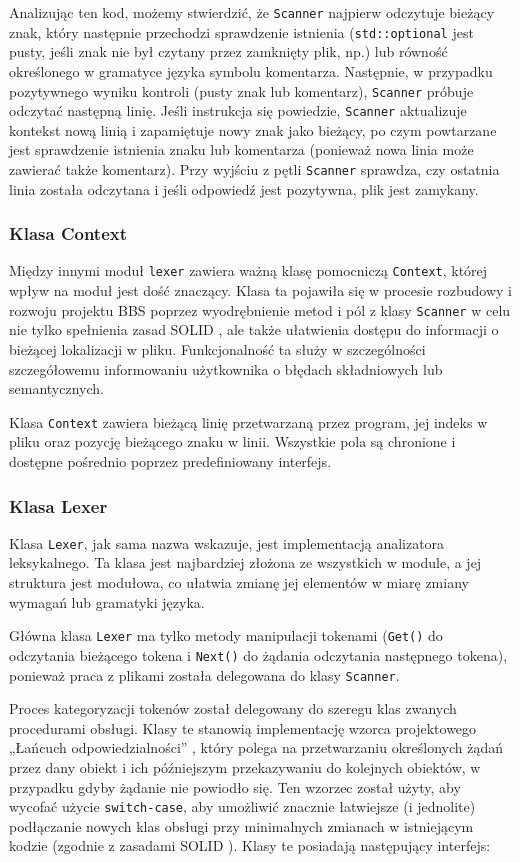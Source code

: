 Analizując ten kod, możemy stwierdzić, że \texttt{Scanner} najpierw odczytuje bieżący znak, który następnie przechodzi sprawdzenie istnienia (\texttt{std::optional} jest pusty, jeśli znak nie był czytany przez zamknięty plik, np.) lub równość określonego w gramatyce języka symbolu komentarza. Następnie, w przypadku pozytywnego wyniku kontroli (pusty znak lub komentarz), \texttt{Scanner} próbuje odczytać następną linię. Jeśli instrukcja się powiedzie, \texttt{Scanner} aktualizuje kontekst nową linią i zapamiętuje nowy znak jako bieżący, po czym powtarzane jest sprawdzenie istnienia znaku lub komentarza (ponieważ nowa linia może zawierać także komentarz). Przy wyjściu z pętli \texttt{Scanner} sprawdza, czy ostatnia linia została odczytana i jeśli odpowiedź jest pozytywna, plik jest zamykany.

\subsubsection{Klasa Context}
Między innymi moduł \texttt{lexer} zawiera ważną klasę pomocniczą \texttt{Context}, której wpływ na moduł jest dość znaczący. Klasa ta pojawiła się w procesie rozbudowy i rozwoju projektu BBS poprzez wyodrębnienie metod i pól z klasy \texttt{Scanner} w celu nie tylko spełnienia zasad SOLID \cite{solid}, ale także ułatwienia dostępu do informacji o bieżącej lokalizacji w pliku. Funkcjonalność ta służy w szczególności szczegółowemu informowaniu użytkownika o błędach składniowych lub semantycznych.

Klasa \texttt{Context} zawiera bieżącą linię przetwarzaną przez program, jej indeks w pliku oraz pozycję bieżącego znaku w linii. Wszystkie pola są chronione i dostępne pośrednio poprzez predefiniowany interfejs.

\subsubsection{Klasa Lexer}
Klasa \texttt{Lexer}, jak sama nazwa wskazuje, jest implementacją analizatora leksykalnego. Ta klasa jest najbardziej złożona ze wszystkich w module, a jej struktura jest modułowa, co ułatwia zmianę jej elementów w miarę zmiany wymagań lub gramatyki języka.

Główna klasa \texttt{Lexer} ma tylko metody manipulacji tokenami (\texttt{Get()} do odczytania bieżącego tokena i \texttt{Next()} do żądania odczytania następnego tokena), ponieważ praca z plikami została delegowana do klasy \texttt{Scanner}.

Proces kategoryzacji tokenów został delegowany do szeregu klas zwanych procedurami obsługi. Klasy te stanowią implementację wzorca projektowego „Łańcuch odpowiedzialności” \cite{cor}, który polega na przetwarzaniu określonych żądań przez dany obiekt i ich późniejszym przekazywaniu do kolejnych obiektów, w przypadku gdyby żądanie nie powiodło się. Ten wzorzec został użyty, aby wycofać użycie \texttt{switch-case}, aby umożliwić znacznie łatwiejsze (i jednolite) podłączanie nowych klas obsługi przy minimalnych zmianach w istniejącym kodzie (zgodnie z zasadami SOLID \cite{solid}). Klasy te posiadają następujący interfejs:

